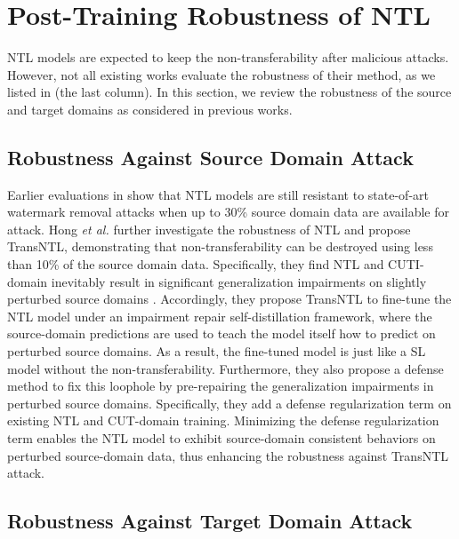 \section{Post-Training Robustness of NTL}
\label{sec:robustness}

NTL models are expected to keep the non-transferability after malicious attacks.
However, not all existing works evaluate the robustness of their method, as we listed in  (the last column). 
In this section, we review the robustness of the source and target domains as considered in previous works.

\subsection{Robustness Against Source Domain Attack} 
\label{sec:robustness_src}

Earlier evaluations in \cite{wang2021non,wang2023model} show that NTL models are still resistant to state-of-art watermark removal attacks when up to 30\% source domain data are available for attack. Hong \textit{et al.}  further investigate the robustness of NTL and propose TransNTL, demonstrating that non-transferability can be destroyed using less than 10\% of the source domain data. Specifically,
they find NTL \cite{wang2021non} and CUTI-domain \cite{wang2023model} inevitably result in significant generalization impairments on slightly perturbed source domains \cite{hendrycks2019benchmarking,cubuk2020randaugment}. Accordingly, they propose TransNTL to fine-tune the NTL model under an impairment repair self-distillation framework, where the source-domain predictions are used to teach the model itself how to predict on perturbed source domains. As a result, the fine-tuned model is just like a SL model without the non-transferability. Furthermore, they also propose a defense method to fix this loophole by pre-repairing the generalization impairments in perturbed source domains.
Specifically, they add a defense regularization term on existing NTL and CUT-domain training. Minimizing the defense regularization term enables the NTL model to exhibit source-domain consistent behaviors on perturbed source-domain data, thus enhancing the robustness against TransNTL attack.

\subsection{Robustness Against Target Domain Attack} 
\label{sec:robustness_tgt}


